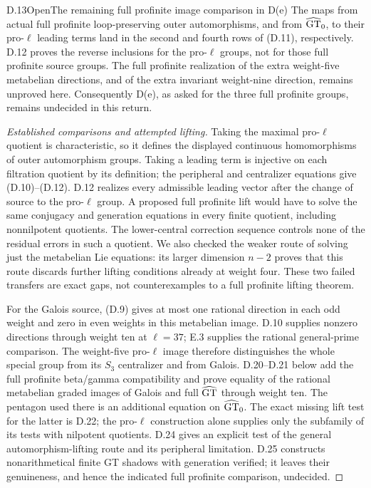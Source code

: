 \begin{statement}{D.13}{Open}{The remaining full profinite image comparison in D(e)}
The maps from actual full profinite loop-preserving outer automorphisms, and from $\widehat{\rm GT}_0$, to their pro-$\ell$ leading terms land in the second and fourth rows of (D.11), respectively. D.12 proves the reverse inclusions for the pro-$\ell$ groups, not for those full profinite source groups. The full profinite realization of the extra weight-five metabelian directions, and of the extra invariant weight-nine direction, remains unproved here. Consequently D(e), as asked for the three full profinite groups, remains undecided in this return.
\end{statement}
\begin{proof}[Established comparisons and attempted lifting]
Taking the maximal pro-$\ell$ quotient is characteristic, so it defines the displayed continuous homomorphisms of outer automorphism groups. Taking a leading term is injective on each filtration quotient by its definition; the peripheral and centralizer equations give (D.10)--(D.12). D.12 realizes every admissible leading vector after the change of source to the pro-$\ell$ group. A proposed full profinite lift would have to solve the same conjugacy and generation equations in every finite quotient, including nonnilpotent quotients. The lower-central correction sequence controls none of the residual errors in such a quotient. We also checked the weaker route of solving just the metabelian Lie equations: its larger dimension $n-2$ proves that this route discards further lifting conditions already at weight four. These two failed transfers are exact gaps, not counterexamples to a full profinite lifting theorem.

For the Galois source, (D.9) gives at most one rational direction in each odd weight and zero in even weights in this metabelian image. D.10 supplies nonzero directions through weight ten at $\ell=37$; E.3 supplies the rational general-prime comparison. The weight-five pro-$\ell$ image therefore distinguishes the whole special group from its $S_3$ centralizer and from Galois. D.20--D.21 below add the full profinite beta/gamma compatibility and prove equality of the rational metabelian graded images of Galois and full $\widehat{\rm GT}$ through weight ten. The pentagon used there is an additional equation on $\widehat{\rm GT}_0$. The exact missing lift test for the latter is D.22; the pro-$\ell$ construction alone supplies only the subfamily of its tests with nilpotent quotients. D.24 gives an explicit test of the general automorphism-lifting route and its peripheral limitation. D.25 constructs nonarithmetical finite GT shadows with generation verified; it leaves their genuineness, and hence the indicated full profinite comparison, undecided.
\end{proof}

